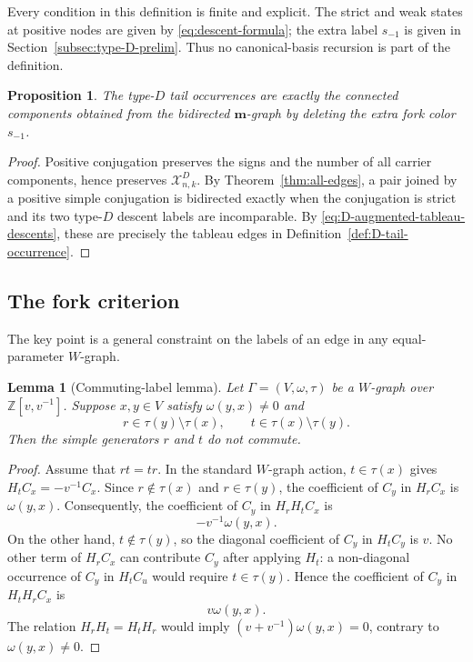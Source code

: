 \documentclass[11pt]{article}
\newtheorem{lemma}[theorem]{Lemma}
\newtheorem{proposition}[theorem]{Proposition}
\theoremstyle{definition}
\theoremstyle{remark}
\newcommand{\cX}{\mathcal X}
\newcommand{\mgraph}{\mathbf m}
\begin{document}
Every condition in this definition is finite and explicit.  The strict
and weak states at positive nodes are given by
\eqref{eq:descent-formula}; the extra label $s_{-1}$ is given in
Section~\ref{subsec:type-D-prelim}.  Thus no canonical-basis recursion is
part of the definition.

\begin{proposition}
\label{prop:D-tail}
The type-$D$ tail occurrences are exactly the connected components
obtained from the bidirected $\mgraph$-graph by deleting the extra fork
color $s_{-1}$.
\end{proposition}

\begin{proof}
Positive conjugation preserves the signs and the number of all carrier
components, hence preserves $\cX^D_{n,k}$.  By
Theorem~\ref{thm:all-edges}, a pair joined by a positive simple
conjugation is bidirected exactly when the conjugation is strict and its
two type-$D$ descent labels are incomparable.  By
\eqref{eq:D-augmented-tableau-descents}, these are precisely the tableau
edges in Definition~\ref{def:D-tail-occurrence}.
\end{proof}

\subsection{The fork criterion}

The key point is a general constraint on the labels of an edge in any
equal-parameter $W$-graph.

\begin{lemma}[Commuting-label lemma]
\label{lem:commuting-label}
Let $\Gamma=(V,\omega,\tau)$ be a $W$-graph over
$\mathbb Z[v,v^{-1}]$.  Suppose $x,y\in V$ satisfy
$\omega(y,x)\ne0$ and
\[
 r\in\tau(y)\setminus\tau(x),\qquad
 t\in\tau(x)\setminus\tau(y).
\]
Then the simple generators $r$ and $t$ do not commute.
\end{lemma}

\begin{proof}
Assume that $rt=tr$.  In the standard $W$-graph action,
$t\in\tau(x)$ gives $H_tC_x=-v^{-1}C_x$.  Since
$r\notin\tau(x)$ and $r\in\tau(y)$, the coefficient of $C_y$ in
$H_rC_x$ is $\omega(y,x)$.  Consequently, the coefficient of $C_y$ in
$H_rH_tC_x$ is
\[
                         -v^{-1}\omega(y,x).
\]
On the other hand, $t\notin\tau(y)$, so the diagonal coefficient of
$C_y$ in $H_tC_y$ is $v$.  No other term of $H_rC_x$ can contribute
$C_y$ after applying $H_t$: a non-diagonal occurrence of $C_y$ in
$H_tC_u$ would require $t\in\tau(y)$.  Hence the coefficient of $C_y$
in $H_tH_rC_x$ is
\[
                           v\omega(y,x).
\]
The relation $H_rH_t=H_tH_r$ would imply
$(v+v^{-1})\omega(y,x)=0$, contrary to $\omega(y,x)\ne0$.
\end{proof}
\end{document}
